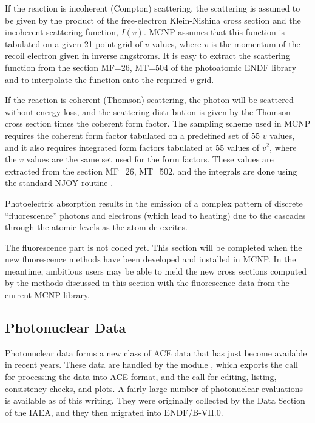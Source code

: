 If the reaction is incoherent (Compton) scattering, the scattering
is assumed to be given by the product of the free-electron
Klein-Nishina cross section and the incoherent scattering function,
$I(v)$.  MCNP assumes that this function is tabulated on a given
21-point grid of $v$ values, where $v$ is the momentum of the recoil
electron given in inverse angstroms.  It is easy to extract the
scattering function from the section MF=26, MT=504 of the photoatomic
ENDF library and to interpolate the function onto the required $v$
grid.

If the reaction is coherent (Thomson) scattering, the photon will
be scattered without energy loss, and the scattering distribution is
given by the Thomson cross section times the coherent form factor.
The sampling scheme used in MCNP requires the coherent form factor
tabulated on a predefined set of 55 $v$ values, and it also requires
integrated form factors tabulated at 55 values of $v^2$, where the
$v$ values are the same set used for the form factors.  These values
are extracted from the section MF=26, MT=502, and the integrals are
done using the standard NJOY routine .

Photoelectric absorption results in the emission of a complex pattern
of discrete ``fluorescence'' photons and electrons
(which lead to heating) due to the cascades through the atomic levels
as the atom de-excites.

The fluorescence part is not coded yet.  This section will be
completed when the new fluorescence methods have been developed and
installed in MCNP.  In the meantime, ambitious users may be able
to meld the new cross sections computed by the methods discussed
in this section with the fluorescence data from the current MCNP
library.


\subsection{Photonuclear Data}
\label{ssACER_pn}

Photonuclear data forms a new class of
ACE data that has just become available in recent years.
These data are handled by the module
,
which exports the call 
for processing the data into ACE format, and the call
 for editing, listing,
consistency checks, and plots.  A fairly large number of
photonuclear evaluations is available as of this writing.  They were
originally collected by the Data Section of the IAEA,
and they then migrated into ENDF/B-VII.0.

